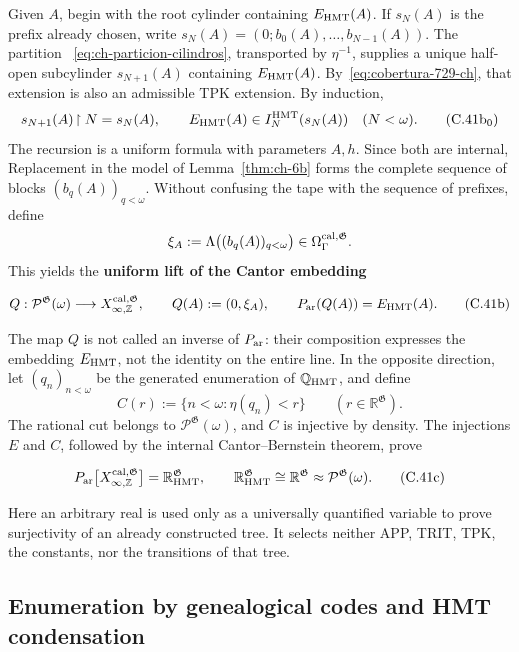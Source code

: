 Given \(A\), begin with the root cylinder containing \(E_{\rm HMT}(A)\). If
\(s_N(A)\) is the prefix already chosen, write
\(s_N(A)=(0;b_0(A),\ldots,b_{N-1}(A))\). The partition
~\eqref{eq:ch-particion-cilindros}, transported by \(\eta^{-1}\), supplies a
unique half-open subcylinder \(s_{N+1}(A)\) containing
\(E_{\rm HMT}(A)\). By~\eqref{eq:cobertura-729-ch}, that extension is also an
admissible TPK extension. By induction,
\[
 s_{N+1}(A)\!\upharpoonright N=s_N(A),\qquad
 E_{\rm HMT}(A)\in I_N^{\rm HMT}(s_N(A))\quad(N<\omega).
\tag{C.41b$_0$}\label{eq:ch-prefijos-uniformes}
\]
The recursion is a uniform formula with parameters \(A,h\). Since both are
internal, Replacement in the model of Lemma~\ref{thm:ch-6b} forms the complete
sequence of blocks \((b_q(A))_{q<\omega}\). Without confusing the tape with
the sequence of prefixes, define
\[
 \xi_A:=\Lambda\bigl((b_q(A))_{q<\omega}\bigr)
 \in\Omega_\Gamma^{\rm cal,\mathfrak G}.
\]
This yields the \textbf{uniform lift of the Cantor embedding}

\[
 Q:\mathcal P^{\mathfrak G}(\omega)
 \longrightarrow X_{\infty,\mathbb Z}^{\rm cal,\mathfrak G},
 \qquad
 Q(A):=(0,\xi_A),\qquad
 P_{\rm ar}(Q(A))=E_{\rm HMT}(A).
\tag{C.41b}\label{eq:ch-levantamiento-uniforme}
\]

The map \(Q\) is not called an inverse of \(P_{\rm ar}\): their composition
expresses the embedding \(E_{\rm HMT}\), not the identity on the entire line.
In the opposite direction, let \((q_n)_{n<\omega}\) be the generated
enumeration of \(\mathbb Q_{\rm HMT}\), and define
\[
 C(r):=\{n<\omega:\eta(q_n)<r\}
 \qquad(r\in\mathbb R^{\mathfrak G}).
\]
The rational cut belongs to \(\mathcal P^{\mathfrak G}(\omega)\), and \(C\)
is injective by density. The injections \(E\) and \(C\), followed by the
internal Cantor--Bernstein theorem, prove

\[
 P_{\rm ar}
 \bigl[X_{\infty,\mathbb Z}^{\rm cal,\mathfrak G}\bigr]
 =\mathbb R_{\rm HMT}^{\mathfrak G},
 \qquad
 \mathbb R_{\rm HMT}^{\mathfrak G}
 \cong\mathbb R^{\mathfrak G}
 \approx\mathcal P^{\mathfrak G}(\omega).
\tag{C.41c}\label{eq:ch-recta-potencia}
\]

Here an arbitrary real is used only as a universally quantified variable to
prove surjectivity of an already constructed tree. It selects neither APP,
TRIT, TPK, the constants, nor the transitions of that tree.

\subsection{Enumeration by genealogical codes and HMT condensation}

